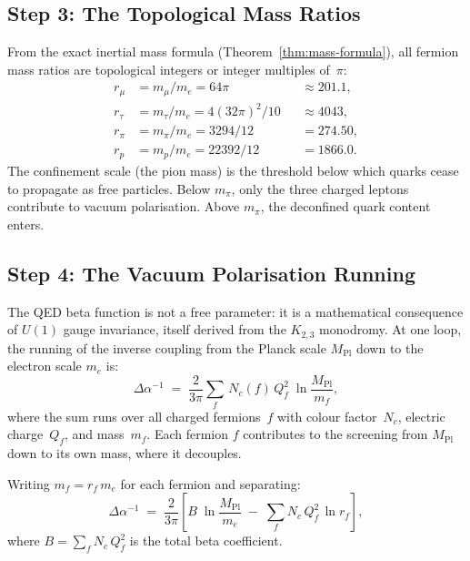 \documentclass[11pt, a4paper, openany]{book}
\newcommand{\MPl}{M_{\mathrm{Pl}}}
\newcounter{thm}[chapter]
\begin{document}
\subsection{Step 3: The Topological Mass Ratios}

From the exact inertial mass formula (Theorem~\ref{thm:mass-formula}),
all fermion mass ratios are topological integers or integer
multiples of~$\pi$:
\begin{equation}
\begin{aligned}
  r_\mu &= m_\mu/m_e = 64\pi &&\approx 201.1, \\
  r_\tau &= m_\tau/m_e = 4(32\pi)^2/10 &&\approx 4043, \\
  r_\pi &= m_\pi/m_e = 3294/12 &&= 274.50, \\
  r_p &= m_p/m_e = 22392/12 &&= 1866.0.
\end{aligned}
  \label{eq:mass-ratios}
\end{equation}
The confinement scale (the pion mass) is the threshold below which
quarks cease to propagate as free particles.  Below $m_\pi$, only
the three charged leptons contribute to vacuum polarisation.  Above
$m_\pi$, the deconfined quark content enters.

\subsection{Step 4: The Vacuum Polarisation Running}

The QED beta function is not a free parameter: it is a mathematical
consequence of $U(1)$ gauge invariance, itself derived from the
$K_{2,3}$ monodromy.  At one loop, the running of the inverse coupling
from the Planck scale $\MPl$ down to the electron scale $m_e$ is:
\begin{equation}
  \Delta\alpha^{-1}
  \;=\; \frac{2}{3\pi}\sum_{f}\, N_c(f)\, Q_f^2
  \;\ln\frac{\MPl}{m_f},
  \label{eq:rg-running-electron}
\end{equation}
where the sum runs over all charged fermions~$f$ with colour
factor~$N_c$, electric charge~$Q_f$, and mass~$m_f$.  Each
fermion $f$ contributes to the screening from $\MPl$
down to its own mass, where it decouples.

Writing $m_f = r_f \, m_e$ for each fermion and separating:
\begin{equation}
  \Delta\alpha^{-1}
  \;=\; \frac{2}{3\pi}\left[
  B\;\ln\frac{\MPl}{m_e}
  \;-\; \sum_f N_c\, Q_f^2\, \ln r_f
  \right],
  \label{eq:rg-separated-electron}
\end{equation}
where $B = \sum_f N_c\, Q_f^2$ is the total beta coefficient.
\end{document}
